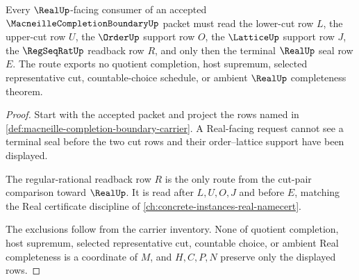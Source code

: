 \begin{theorem}
\label{thm:macneille-completion-boundary-real-route}
Every $\RealUp$-facing consumer of an accepted $\MacneilleCompletionBoundaryUp$ packet must read the lower-cut row $L$, the upper-cut row $U$, the $\OrderUp$ support row $O$, the $\LatticeUp$ support row $J$, the $\RegSeqRatUp$ readback row $R$, and only then the terminal $\RealUp$ seal row $E$. The route exports no quotient completion, host supremum, selected representative cut, countable-choice schedule, or ambient $\RealUp$ completeness theorem.
\end{theorem}
\begin{proof}
Start with the accepted packet and project the rows named in \autoref{def:macneille-completion-boundary-carrier}. A Real-facing request cannot see a terminal seal before the two cut rows and their order--lattice support have been displayed.

The regular-rational readback row $R$ is the only route from the cut-pair comparison toward $\RealUp$. It is read after $L,U,O,J$ and before $E$, matching the Real certificate discipline of \autoref{ch:concrete-instances-real-namecert}.

The exclusions follow from the carrier inventory. None of quotient completion, host supremum, selected representative cut, countable choice, or ambient Real completeness is a coordinate of $M$, and $H,C,P,N$ preserve only the displayed rows.
\end{proof}




